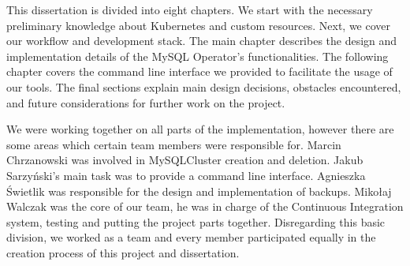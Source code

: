 This dissertation is divided into eight chapters. We start with the necessary 
preliminary knowledge about Kubernetes and custom resources. Next, we cover 
our workflow and development stack. The main chapter describes the design and 
implementation details of the MySQL Operator's functionalities. The following 
chapter covers the command line interface we  provided to facilitate the usage
of our tools. The final sections explain main  design decisions, obstacles encountered,
and future considerations for further work on the project.

We were working together on all parts of the implementation, however there are 
some areas which certain team members were responsible for. Marcin Chrzanowski 
was involved in MySQLCluster creation and deletion. Jakub 
Sarzyński’s main task was to provide a command line interface. 
Agnieszka Świetlik was responsible for the design and implementation of backups. Mikołaj 
Walczak was the core of our team, he was in charge of the Continuous Integration system, 
testing and putting the project parts together. Disregarding this basic division, 
we worked as a team and every member participated equally in the creation process 
of this project and dissertation.
